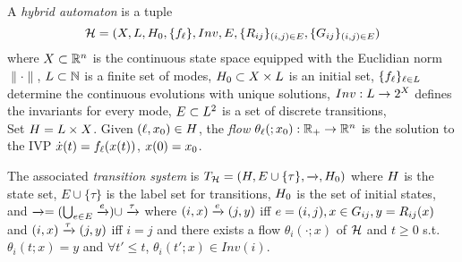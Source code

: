 \begin{defn}
	\label{defn:hybrid system}	
	A \emph{hybrid automaton} is a tuple \[\mathcal{H} = (X,L,H_0,\{f_\ell\}, Inv,E, \{R_{ij}\}_{(i,j)\in E}, \{G_{ij}\}_{(i,j)\in E})\] where 
		 $X \subset \mathbb{R}^n$ is the continuous state space equipped with the Euclidian norm $\|\cdot\|$, 
		$L \subset \mathbb{N}$ is a finite set of modes,
		 $H_0 \subset X \times L$ is an initial set,
		 $\{f_\ell\}_{\ell \in L}$ determine the continuous evolutions with unique solutions,
		 $Inv: L \rightarrow 2^X$ defines the invariants for every mode,
		 $E \subset L^2$ is a set of discrete transitions,
		 \\
		 Set $H = L\times X$.
		 Given $(\ell,x_0) \in H$, the \emph{flow} $\theta_{\ell}(;x_0):\mathbb{R}_+ \rightarrow \mathbb{R}^n$ is the solution to the IVP $\dot{x}(t) = f_\ell (x(t))$, $x(0)=x_0$.
\end{defn}
%
The associated \emph{transition system} is $T_{\mathcal{H}} = (H,  E \cup \{\tau\},\xrightarrow{},H_0)$ 
where $H$ is the state set, $E \cup \{\tau\}$ is the label set for transitions, $H_0$ is the set of initial states, 
and $\xrightarrow{} = (\bigcup_{e \in E} \xrightarrow{e}) \cup \xrightarrow{\tau}$ 
where $(i,x) \xrightarrow{e} (j,y)$ iff $e = (i,j), x \in G_{ij}, y = R_{ij}(x)$ and $(i,x) \xrightarrow{\tau} (j,y)$ iff $i = j$ and there exists 
a flow $\theta_i(\cdot;x)$ of $\mathcal{H}$ and $t\geq 0$ s.t. $\theta_i(t;x)=y$ and $\forall t' \leq t$, $\theta_i(t';x) \in Inv(i)$.

